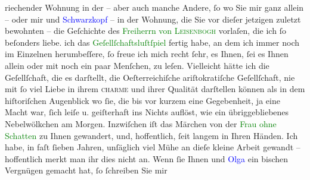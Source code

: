                riechender Wohnung in der \label{K_L02331_2v}\label{K_L02331_2h} – aber auch manche Andere, ſo \label{K_L02331_3v}\label{K_L02331_3h} wo Sie mir
               ganz allein – oder mir und \textcolor{blue}{Schwarzkopf}{}\ledrightnote{\textcolor{blue}{Gustav Schwarzkopf}} – in der
               Wohnung, die Sie vor dieſer jetzigen zuletzt bewohnten – die Geſchichte des \textcolor{green}{Freiherrn von \textsc{Leisenbogh}}{}\ledrightnote{\textcolor{green}{Das Schicksal des Freiherrn von Leisenbohg. Novellette}} vorlaſen, die ich ſo beſonders liebe.\pend
           \pstart
           \label{T_L02331_1v}\label{T_L02331_1h}{ }{\pb}ich das \textcolor{green}{Geſellſchaftsluſtſpiel}{} fertig habe, an dem ich
               immer noch im Einzelnen herumbeſſere, ſo freue ich mich recht ſehr, es Ihnen, ſei es
               Ihnen allein oder mit noch ein paar Menſchen, zu leſen. Vielleicht hätte ich die
               Geſellſchaft, die es darſtellt, die Oeſterreichiſche  ariſtokratiſche Geſellſchaft, nie mit ſo viel Liebe in ihrem \textsc{charme} und ihrer Qualität darſtellen können als in dem
               hiſtoriſchen Augenblick wo ſie, die bis vor kurzem eine Gegebenheit, ja eine Macht
               war, ſich leiſe u. geiſterhaft ins Nichts auflöst, wie {\pb}ein übriggebliebenes Nebelwölkchen
               am Morgen.\pend
           \pstart
           Inzwiſchen iſt das Märchen von der \textcolor{green}{Frau ohne
                  Schatten}{}\ledrightnote{\textcolor{green}{Die Frau ohne Schatten. Erzählung}} zu Ihnen gewandert, und, hoffentlich, ſeit langem in Ihren
               Händen.\pend
           \pstart
           Ich habe, in faſt ſieben Jahren, unſäglich viel Mühe an dieſe kleine Arbeit gewandt –
               hoffentlich merkt man ihr dies nicht an. Wenn ſie Ihnen und \textcolor{blue}{Olga}{}\ledrightnote{\textcolor{blue}{Olga Schnitzler}} ein bischen Vergnügen gemacht hat, ſo ſchreiben Sie mir
